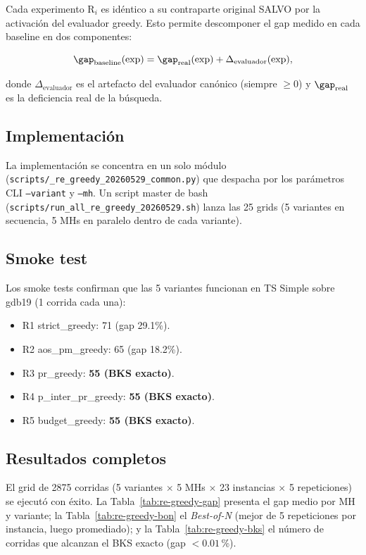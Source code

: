 Cada experimento R$_i$ es idéntico a su contraparte original SALVO por
la activación del evaluador greedy. Esto permite descomponer el gap
medido en cada baseline en dos componentes:

\begin{equation}
\gap_{\text{baseline}}(\text{exp}) = \gap_{\text{real}}(\text{exp}) +
\Delta_{\text{evaluador}}(\text{exp}),
\end{equation}

donde $\Delta_{\text{evaluador}}$ es el artefacto del evaluador
canónico (siempre $\ge 0$) y $\gap_{\text{real}}$ es la deficiencia
real de la búsqueda.

\subsection{Implementación}

La implementación se concentra en un solo módulo
(\texttt{scripts/\_re\_greedy\_20260529\_common.py}) que despacha por
los parámetros CLI \texttt{--variant} y \texttt{--mh}. Un script
master de bash (\texttt{scripts/run\_all\_re\_greedy\_20260529.sh})
lanza las 25 grids (5 variantes en secuencia, 5 MHs en paralelo dentro
de cada variante).

\subsection{Smoke test}

Los smoke tests confirman que las 5 variantes funcionan en TS Simple
sobre gdb19 (1 corrida cada una):

\begin{itemize}
\item R1 strict\_greedy: 71 (gap 29.1\%).
\item R2 aos\_pm\_greedy: 65 (gap 18.2\%).
\item R3 pr\_greedy: \textbf{55 (BKS exacto)}.
\item R4 p\_inter\_pr\_greedy: \textbf{55 (BKS exacto)}.
\item R5 budget\_greedy: \textbf{55 (BKS exacto)}.
\end{itemize}

\subsection{Resultados completos}

El grid de 2875 corridas (5 variantes $\times$ 5 MHs $\times$ 23 instancias
$\times$ 5 repeticiones) se ejecutó con éxito. La
Tabla~\ref{tab:re-greedy-gap} presenta el gap medio por MH y variante;
la Tabla~\ref{tab:re-greedy-bon} el \emph{Best-of-N} (mejor de 5
repeticiones por instancia, luego promediado); y la
Tabla~\ref{tab:re-greedy-bks} el número de corridas que alcanzan el BKS
exacto (gap $< 0.01$\,\%).

